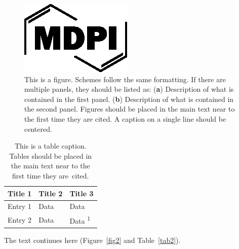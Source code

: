\documentclass[journal,article,submit,pdftex,moreauthors]{Definitions/mdpi}
\begin{document}
\begin{figure}[H]
\includegraphics[width=10.5 cm]{Definitions/logo-mdpi}
\caption{This is a figure. Schemes follow the same formatting. If there are multiple panels, they should be listed as: (\textbf{a}) Description of what is contained in the first panel. (\textbf{b}) Description of what is contained in the second panel. Figures should be placed in the main text near to the first time they are cited. A caption on a single line should be centered.\label{fig1}}
\end{figure}
\unskip

\begin{table}[H]
\caption{This is a table caption. Tables should be placed in the main text near to the first time they are~cited.\label{tab1}}
\begin{tabularx}{\textwidth}{CCC}
\toprule
\textbf{Title 1}	& \textbf{Title 2}	& \textbf{Title 3}\\
\midrule
Entry 1		& Data			& Data\\
Entry 2		& Data			& Data \textsuperscript{1}\\
\bottomrule
\end{tabularx}
\end{table}

The text continues here (Figure~\ref{fig2} and Table~\ref{tab2}).
\end{document}
